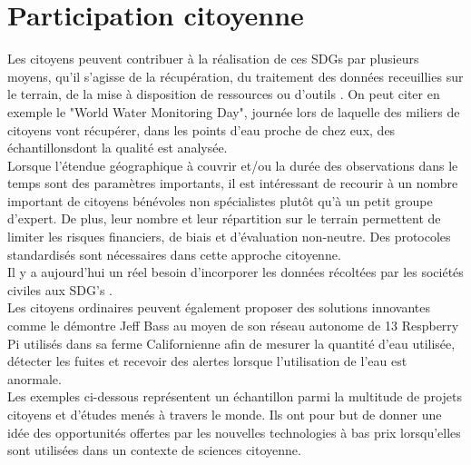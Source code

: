 \documentclass[10pt, article]{llncs}
\begin{document}
\section{Participation citoyenne}
	Les citoyens peuvent contribuer à la réalisation de ces SDGs par plusieurs moyens, qu'il s'agisse de la récupération, du traitement des données receuillies sur le terrain, de la mise à disposition de ressources ou d'outils \cite{lordkipanidze_che_2014}. On peut citer en exemple le "World Water Monitoring Day", journée lors de laquelle des miliers de citoyens vont récupérer, dans les points d'eau proche de chez eux, des échantillonsdont la qualité est analysée. \\
	Lorsque l'étendue géographique à couvrir et/ou la durée des observations dans le temps sont des paramètres importants, il est intéressant de recourir à un nombre important de citoyens bénévoles non spécialistes plutôt qu'à un petit groupe d'expert. De plus, leur nombre et leur répartition sur le terrain permettent de limiter les risques financiers, de biais et d'évaluation non-neutre. Des protocoles standardisés sont nécessaires dans cette approche citoyenne.\\
	Il y a aujourd'hui un réel besoin d'incorporer les données récoltées par les sociétés civiles aux SDG's \cite{fluckiger_sustainable_2016}.\\
	Les citoyens ordinaires peuvent également proposer des solutions innovantes comme le démontre Jeff Bass au moyen de son réseau autonome de 13 Respberry Pi utilisés dans sa ferme Californienne afin de mesurer la quantité d'eau utilisée, détecter les fuites et recevoir des alertes lorsque l'utilisation de l'eau est anormale.\\
	Les exemples ci-dessous représentent un échantillon parmi la multitude de projets citoyens et d'études menés à travers le monde. Ils ont pour but de donner une idée des opportunités offertes par les nouvelles technologies à bas prix lorsqu'elles sont utilisées dans un contexte de sciences citoyenne.
	
\end{document}
